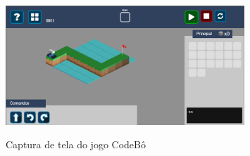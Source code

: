 \begin{figure}[H]
	\centering
	\caption{Captura de tela do jogo CodeBô}
	\includegraphics[width=0.8\textwidth]{images/codebo.png}
	\label{fig:codebo}
\end{figure}

